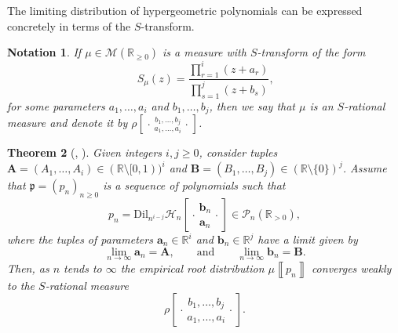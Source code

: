 \documentclass[reqno,11pt]{amsart}
\newtheorem{theorem}{Theorem}[section]
\newtheorem{notation}[theorem]{Notation}
\theoremstyle{remark}
\newcommand{\pols}{\mathcal{P}}
\newcommand{\rr}{\mathbb{R}}
\newcommand{\MM}{\mathcal{M}}
\newcommand{\mfp}{\mathfrak{p}}
\newcommand{\dil}[1]{\mbox{Dil}_{#1}}
\newcommand*\HGP[3]{%
 \mathcal{H}_{#1}{\left[\genfrac..{0pt}{1}{#2}{#3}\right]}%
}
\newcommand*\SRM[2]{%
 \rho{\left[\genfrac..{0pt}{1}{#1}{#2}\right]}%
}
\newcommand{\meas}[1]{\mu \left\llbracket #1 \right\rrbracket}
\begin{document}
The limiting distribution of hypergeometric polynomials can be expressed concretely in terms of the $S$-transform.

\begin{notation}
\label{nota:rhoparamseven}
If $\mu\in \MM(\rr_{\geq 0})$ is a measure with $S$-transform of the form
\[ S_{\mu}(z)= \frac{\prod_{r=1}^i (z+a_r) }{\prod_{s=1}^j(z+b_s)} \text{,} \]
for some parameters $a_1,\dots, a_i$ and $b_1,\dots,b_j$, then we say that $\mu$ is an \emph{$S$-rational measure} and denote it by $\SRM{b_1,\dots, b_j}{a_1,\dots, a_i}$.
\end{notation}


\begin{theorem}[{\cite[Theorem 3.9]{martinez2025zeros}, \cite[Corollary 10.8]{arizmendi2024s}}]
    \label{thm:HypLimit}
    Given integers $i,j\geq 0$, consider tuples $\bm A=(A_1,\dots, A_i) \in (\rr\setminus [0,1))^i$ and $\bm B=(B_1,\dots, B_j)\in (\rr\setminus \{0\})^j$. Assume that $\mfp=(p_n)_{n\geq 0}$ is a sequence of polynomials such that
    \begin{equation} \label{sequencePn}
        p_n=\dil{n^{i-j}}\HGP{n}{\bm b_n}{\bm a_n}\in\pols_n(\rr_{> 0}),
    \end{equation}
    where the tuples of parameters $\bm a_n \in \rr^i$ and $\bm b_n\in \rr^j$ have a limit given by
    \begin{equation} \label{assumptionlimits}
        \lim_{n\to\infty} \bm a_n=\bm A, \qquad \text{and} \qquad \lim_{n\to\infty} \bm b_n=\bm B.
    \end{equation}
    Then, as $n$ tends to $\infty$ the empirical root distribution $\meas{p_n}$ converges weakly to the $S$-rational measure $$\SRM{b_1,\dots, b_j}{a_1,\dots, a_i}.$$ 
\end{theorem}
\end{document}
